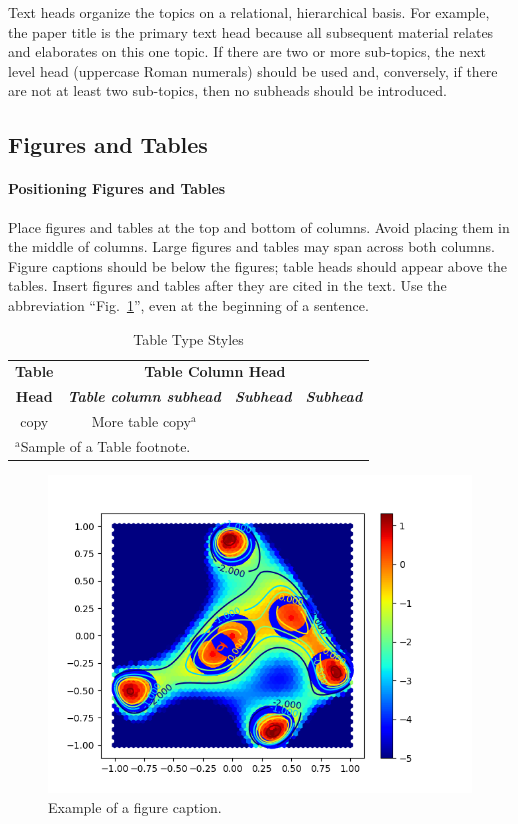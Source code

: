 \documentclass[conference]{IEEEtran}
\begin{document}
Text heads organize the topics on a relational, hierarchical basis. For 
example, the paper title is the primary text head because all subsequent 
material relates and elaborates on this one topic. If there are two or more 
sub-topics, the next level head (uppercase Roman numerals) should be used 
and, conversely, if there are not at least two sub-topics, then no subheads 
should be introduced.

\subsection{Figures and Tables}
\paragraph{Positioning Figures and Tables} Place figures and tables at the top and 
bottom of columns. Avoid placing them in the middle of columns. Large 
figures and tables may span across both columns. Figure captions should be 
below the figures; table heads should appear above the tables. Insert 
figures and tables after they are cited in the text. Use the abbreviation 
``Fig.~\ref{fig}'', even at the beginning of a sentence.

\begin{table}[htbp]
\caption{Table Type Styles}
\begin{center}
\begin{tabular}{|c|c|c|c|}
\hline
\textbf{Table}&\multicolumn{3}{|c|}{\textbf{Table Column Head}} \\
\cline{2-4} 
\textbf{Head} & \textbf{\textit{Table column subhead}}& \textbf{\textit{Subhead}}& \textbf{\textit{Subhead}} \\
\hline
copy& More table copy$^{\mathrm{a}}$& &  \\
\hline
\multicolumn{4}{l}{$^{\mathrm{a}}$Sample of a Table footnote.}
\end{tabular}
\label{tab2}
\end{center}
\end{table}

\begin{figure}[htbp]
\centerline{\includegraphics[scale=0.5]{fig1}}
\caption{Example of a figure caption.}
\label{fig}
\end{figure}
\end{document}
